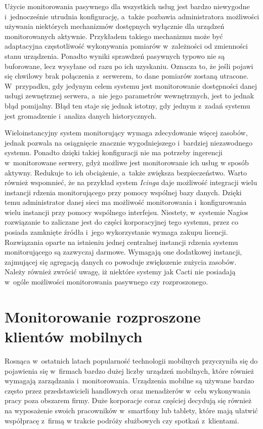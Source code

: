 Użycie monitorowania pasywnego dla wszystkich usług jest bardzo
niewygodne i~jednocześnie utrudnia konfigurację, a~także pozbawia
administratora możliwości używania niektórych mechanizmów dostępnych
wyłącznie dla urządzeń monitorowanych aktywnie. Przykładem takiego
mechanizmu może być adaptacyjna częstotliwość wykonywania pomiarów
w~zależności od zmienności stanu urządzenia. Ponadto wyniki sprawdzeń
pasywnych typowo nie są buforowane, lecz wysyłane od razu po ich
uzyskaniu. Oznacza to, że jeśli pojawi się chwilowy brak połączenia
z~serwerem, to dane pomiarów zostaną utracone. W~przypadku, gdy
jedynym celem systemu jest monitorowanie dostępności danej usługi
zewnętrznej serwera, a~nie jego parametrów wewnętrznych, jest to jednak
błąd pomijalny. Błąd ten staje się jednak istotny, gdy jednym z~zadań
systemu jest gromadzenie i~analiza danych historycznych.

Wieloinstancyjny system monitorujący wymaga zdecydowanie więcej
zasobów, jednak pozwala na osiągnięcie znacznie wygodniejszego
i~bardziej niezawodnego systemu. Ponadto dzięki takiej konfiguracji
nie ma potrzeby ingerencji w~monitorowane serwery, gdyż możliwe jest
monitorowanie ich usług w sposób aktywny. Redukuje to ich obciążenie,
a~także zwiększa bezpieczeństwo. Warto również wspomnieć, że na
przykład system {\em Icinga} daje możliwość integracji wielu instancji
rdzenia monitorującego przy pomocy wspólnej bazy danych. Dzięki temu
administrator danej sieci ma możliwość monitorowania i~konfigurowania
wielu instancji przy pomocy wspólnego interfejsu. Niestety, w~systemie
Nagios rozwiązanie to zaliczane jest do części korporacyjnej tego
systemu, przez co posiada zamknięte źródła i~jego wykorzystanie wymaga
zakupu licencji. Rozwiązania oparte na istnieniu jednej centralnej
instancji rdzenia systemu monitorującego są zazwyczaj
darmowe. Wymagają one dodatkowej instancji, zajmującej się agregacją
danych co powoduje zwiększenie zużycia zasobów. Należy również zwrócić
uwagę, iż niektóre systemy jak Cacti nie posiadają w~ogóle możliwości
monitorowania pasywnego czy rozproszonego.

\section[Monitorowanie rozproszone][Monitorowanie rozproszone klientów
mobilnych]{Monitorowanie rozproszone klientów mobilnych}

Rosnąca w~ostatnich latach popularność technologii mobilnych
przyczyniła się do pojawienia się w~firmach bardzo dużej liczby
urządzeń mobilnych, które również wymagają zarządzania
i~monitorowania. Urządzenia mobilne są używane bardzo często przez
przedstawicieli handlowych oraz menadżerów w~celu wykonywania pracy
poza obszarem firmy. Duże korporacje coraz częściej decydują się
również na wyposażenie swoich pracowników w~smartfony lub tablety,
które mają ułatwić współpracę z~firmą w trakcie podróży służbowych czy
spotkań z~klientami.

